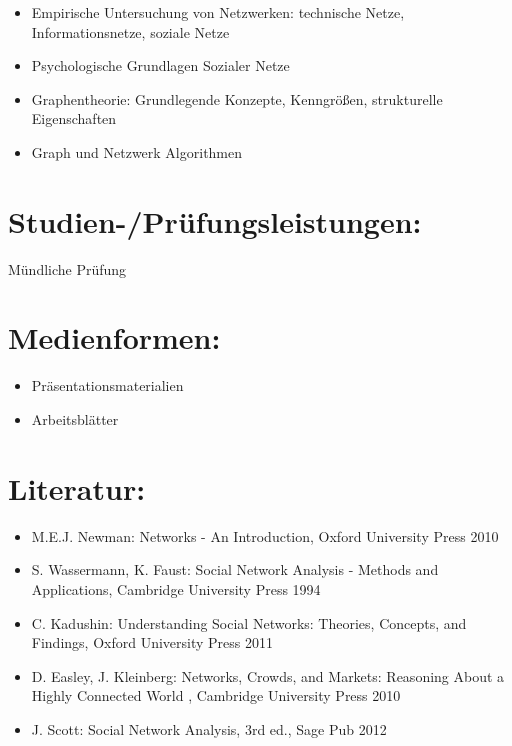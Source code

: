 \begin{itemize}
\tightlist
\item
  Empirische Untersuchung von Netzwerken: technische Netze,
  Informationsnetze, soziale Netze
\item
  Psychologische Grundlagen Sozialer Netze
\item
  Graphentheorie: Grundlegende Konzepte, Kenngrößen, strukturelle
  Eigenschaften
\item
  Graph und Netzwerk Algorithmen
\end{itemize}

\section*{Studien-/Prüfungsleistungen:}\label{studien-pruxfcfungsleistungen-11}

Mündliche Prüfung

\section*{Medienformen:}\label{medienformen-11}

\begin{itemize}
\tightlist
\item
  Präsentationsmaterialien
\item
  Arbeitsblätter
\end{itemize}

\section*{Literatur:}\label{literatur-11}

\begin{itemize}
\tightlist
\item
  M.E.J. Newman: Networks - An Introduction, Oxford University Press
  2010
\item
  S. Wassermann, K. Faust: Social Network Analysis - Methods and
  Applications, Cambridge University Press 1994
\item
  C. Kadushin: Understanding Social Networks: Theories, Concepts, and
  Findings, Oxford University Press 2011
\item
  D. Easley, J. Kleinberg: Networks, Crowds, and Markets: Reasoning
  About a Highly Connected World , Cambridge University Press 2010
\item
  J. Scott: Social Network Analysis, 3rd ed., Sage Pub 2012
\end{itemize}

